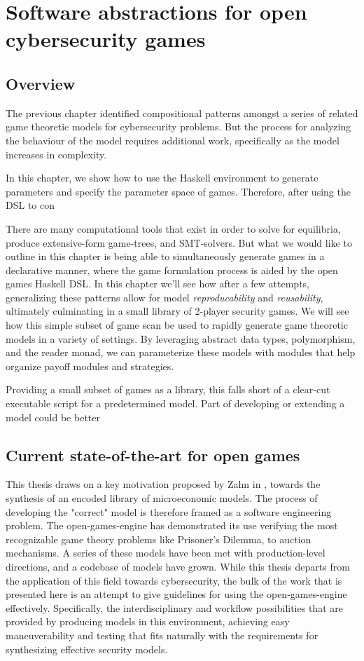 \section{Software abstractions for open cybersecurity games}
\label{sec:2}
\subsection{Overview}
The previous chapter identified compositional patterns amongst a series of related game theoretic models for cybersecurity problems. But the process for analyzing the behaviour of the model requires additional work, specifically as the model increases in complexity. 

In this chapter, we show how to use the Haskell environment to generate parameters and specify the parameter space of games. Therefore, after using the DSL to con

There are many computational tools that exist in order to solve for equilibria, produce extensive-form game-trees, and SMT-solvers. But what we would like to outline in this chapter is being able to simultaneously generate games in a declarative manner, where the game formulation process is aided by the open games Haskell DSL. In this chapter we'll see how after a few attempts, generalizing these patterns allow for model \textit{reproducability} and \textit{reusability}, ultimately culminating in a small library of 2-player security games. We will see how this simple subset of game scan be used to rapidly generate game theoretic models in a variety of settings. By leveraging abstract data types, polymorphism, and the reader monad, we can parameterize these models with modules that help organize payoff modules and strategies. 

Providing a small subset of games as a library, this falls short of a clear-cut executable script for a predetermined model. Part of developing or extending a model could be better 



\subsection{Current state-of-the-art for open games}
This thesis draws on a key motivation proposed by Zahn in \cite{ZahnCybercat}, towards the synthesis of an encoded library of microeconomic models. The process of developing the "correct" model is therefore framed as a software engineering problem. The open-games-engine has demonstrated its use verifying the most recognizable game theory problems like Prisoner's Dilemma, to auction mechanisms. A series of these models have been met with production-level directions, and a codebase of models have grown. While this thesis departs from the application of this field towards cybersecurity, the bulk of the work that is presented here is an attempt to give guidelines for using the open-games-engine effectively. Specifically, the interdisciplinary and workflow possibilities that are provided by producing models in this environment, achieving easy maneuverability and testing that fits naturally with the requirements for synthesizing effective security models. 

